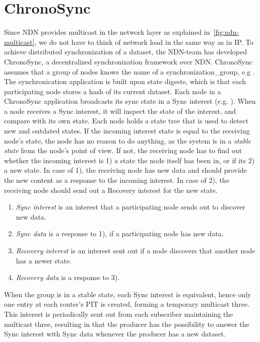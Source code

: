 \chapter{ChronoSync}\label{apx:chronosync}

Since \gls{NDN} provides multicast in the network layer as explained in~\autoref{fig:ndn-multicast}, we do not have to think of network load in the same way as in \gls{IP}.  
To achieve distributed synchronization of a \gls{data}set, the \gls{NDN}-team has developed ChronoSync, a decentralized synchronization framework over \gls{NDN}. 
ChronoSync assumes that a group of nodes knows the \gls{name} of a \gls{synchronization_group}, e.g .
The synchronication application is built upon state digests, which is that each participating node stores a hash of its current \gls{data}set. 
Each node in a ChronoSync application broadcasts its sync state in a Sync \gls{interest} (e.g. ).
When a node receives a Sync \gls{interest}, it will inspect the state of the \gls{interest}, and compare with its own state.
Each node holds a state tree that is used to detect new and outdated states.
If the incoming \gls{interest} state is equal to the receiving node's state, the node has no reason to do anything, as the system is in a \textit{stable state} from the node's point of view.
If not, the receiving node has to find out whether the incoming \gls{interest} is 1) a state the node itself has been in, or if its 2) a new state.
In case of 1), the receiving node has new \gls{data} and should provide the new content as a response to the incoming \gls{interest}. In case of 2), the receiving node should send out a Recovery \gls{interest} for the new state.

\begin{enumerate}
  \item \textit{Sync \gls{interest}} is an \gls{interest} that a participating node sends out to discover new \gls{data}.
  \item \textit{Sync \gls{data}} is a response to 1), if a participating node has new \gls{data}.
  \item \textit{Recovery \gls{interest}} is an \gls{interest} sent out if a node discovers that another node has a newer state.
  \item \textit{Recovery \gls{data}} is a response to 3).
\end{enumerate}

When the group is in a stable state, each Sync \gls{interest} is equivalent, hence only one entry at each router's \gls{PIT} is created, forming a temporary multicast three.
This \gls{interest} is periodically sent out from each subscriber maintaining the multicast three, resulting in that the producer has the possibility to answer the Sync \gls{interest} with Sync \gls{data} whenever the producer has a new \gls{data}set.

